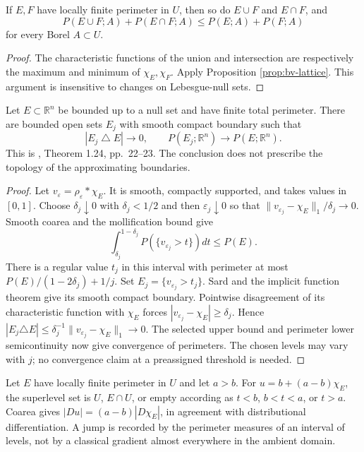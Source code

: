\begin{corollary}\label{cor:perimeter-submodularity}
If $E,F$ have locally finite perimeter in $U$, then so do $E\cup F$ and $E\cap F$, and
\[
 P(E\cup F;A)+P(E\cap F;A)\leq P(E;A)+P(F;A)
\]
for every Borel $A\subset U$.
\end{corollary}
\begin{proof}
The characteristic functions of the union and intersection are respectively the maximum and minimum of $\chi_E,\chi_F$. Apply Proposition \ref{prop:bv-lattice}. This argument is insensitive to changes on Lebesgue-null sets.
\end{proof}

\begin{theorem}\label{thm:perimeter-smooth-approximation}
Let $E\subset\mathbb R^n$ be bounded up to a null set and have finite total perimeter. There are bounded open sets $E_j$ with smooth compact boundary such that
\[
 |E_j\mathbin{\triangle}E|\to0,\qquad P(E_j;\mathbb R^n)\to P(E;\mathbb R^n).
\]
This is \cite{Giu84}, Theorem 1.24, pp.~22--23. The conclusion does not prescribe the topology of the approximating boundaries.
\end{theorem}
\begin{proof}
Let $v_\varepsilon=\rho_\varepsilon*\chi_E$. It is smooth, compactly supported, and takes values in $[0,1]$. Choose $\delta_j\downarrow0$ with $\delta_j<1/2$ and then $\varepsilon_j\downarrow0$ so that $\|v_{\varepsilon_j}-\chi_E\|_1/\delta_j\to0$. Smooth coarea and the mollification bound give
\[
 \int_{\delta_j}^{1-\delta_j}P(\{v_{\varepsilon_j}>t\})dt\leq P(E).
\]
There is a regular value $t_j$ in this interval with perimeter at most $P(E)/(1-2\delta_j)+1/j$. Set $E_j=\{v_{\varepsilon_j}>t_j\}$. Sard and the implicit function theorem give its smooth compact boundary. Pointwise disagreement of its characteristic function with $\chi_E$ forces $|v_{\varepsilon_j}-\chi_E|\geq\delta_j$. Hence
$|E_j\triangle E|\leq\delta_j^{-1}\|v_{\varepsilon_j}-\chi_E\|_1\to0$.
The selected upper bound and perimeter lower semicontinuity now give convergence of perimeters. The chosen levels may vary with $j$; no convergence claim at a preassigned threshold is needed.
\end{proof}

\begin{example}\label{ex:bv-jump-coarea}
Let $E$ have locally finite perimeter in $U$ and let $a>b$. For $u=b+(a-b)\chi_E$, the superlevel set is $U$, $E\cap U$, or empty according as $t<b$, $b<t<a$, or $t>a$. Coarea gives $|Du|=(a-b)|D\chi_E|$, in agreement with distributional differentiation. A jump is recorded by the perimeter measures of an interval of levels, not by a classical gradient almost everywhere in the ambient domain.
\end{example}

